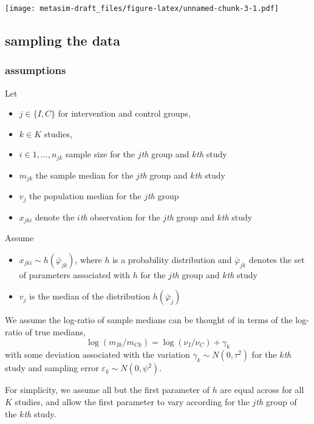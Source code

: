 \documentclass[]{article}
\providecommand{\tightlist}{%
  \setlength{\itemsep}{0pt}\setlength{\parskip}{0pt}}
\begin{document}
\texttt{[image: metasim-draft\_files/figure-latex/unnamed-chunk-3-1.pdf]}

\hypertarget{sampling-the-data}{%
\subsection{sampling the data}\label{sampling-the-data}}

\hypertarget{assumptions}{%
\subsubsection{assumptions}\label{assumptions}}

Let

\begin{itemize}
\tightlist
\item
  \(j \in \{I, C\}\) for intervention and control groups,
\item
  \(k \in K\) studies,
\item
  \(i \in 1, \dots, n_{jk}\) sample size for the \(j\)\emph{th} group
  and \(k\)\emph{th} study
\item
  \(m_{jk}\) the sample median for the \(j\)\emph{th} group and
  \(k\)\emph{th} study
\item
  \(v_j\) the population median for the \(j\)\emph{th} group
\item
  \(x_{jki}\) denote the \(i\)\emph{th} observation for the
  \(j\)\emph{th} group and \(k\)\emph{th} study
\end{itemize}

Assume

\begin{itemize}
\tightlist
\item
  \(x_{jki} \sim h(\bar \varphi_{jk})\), where \(h\) is a probability
  distribution and \(\bar \varphi_{jk}\) denotes the set of parameters
  associated with \(h\) for the \(j\)\emph{th} group and \(k\)\emph{th}
  study
\item
  \(v_j\) is the median of the distribution \(h(\bar \varphi_j)\)
\end{itemize}

We assume the log-ratio of sample medians can be thought of in terms of
the log-ratio of true medians, \[
\log (m_{Ik}/m_{Ck}) = \log(\nu_I/\nu_C) + \gamma_k
\] with some deviation associated with the variation
\(\gamma_k \sim N(0, \tau^2)\) for the \(k\)\emph{th} study and sampling
error \(\varepsilon_k \sim N(0, \psi^2)\).

For simplicity, we assume all but the first parameter of \(h\) are equal
across for all \(K\) studies, and allow the first parameter to vary
according for the \(j\)\emph{th} group of the \(k\)\emph{th} study.
\end{document}
